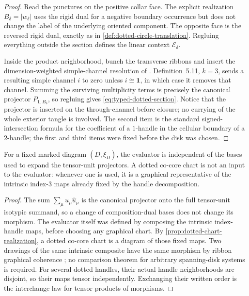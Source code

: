 \begin{proof}
Read the punctures on the positive collar face.  The explicit realization
$B_\delta=|w_\delta|$ uses the rigid dual for a negative boundary occurrence
but does not change the label of the underlying oriented component.  The
opposite face is the reversed rigid dual, exactly as in
\cref{def:dotted-circle-translation}.  Regluing everything
outside the section defines the linear context $\mathcal E_\delta$.

Inside the product neighborhood, bunch the transverse ribbons and insert the
dimension-weighted simple-channel resolution of
\cite[Lemma~2.27]{Tham2021}.  Definition~5.11, $k=3$, sends a resulting simple
channel $i$ to zero unless $i\cong\mathbf1$, in which case it removes that
channel.  Summing the surviving multiplicity terms is precisely the canonical
projector $P_{\mathbf1,B_\delta}$, so regluing gives
\eqref{eq:typed-dotted-section}.  Notice that the projector is inserted on
the through-channel before closure; no currying of the whole exterior tangle
is involved.  The second item is the standard signed-intersection formula for
the coefficient of a $1$-handle in the cellular boundary of a $2$-handle; the
first and third items were fixed before the disk was chosen.
\end{proof}

\begin{proposition}
\label{prop:graphical-auxiliary-independence}
For a fixed marked diagram $(D,\xi_D)$, the evaluator is independent of the
bases used to expand the tensor-unit projectors.  A dotted co-core chart is
not an input to the evaluator: whenever one is used, it is a graphical
representative of the intrinsic index-$3$ maps already fixed by the handle
decomposition.
\end{proposition}

\begin{proof}
The sum $\sum_\mu u_\mu\widehat u_\mu$ is the canonical projector onto the
full tensor-unit isotypic summand, so a change of composition-dual bases does
not change its morphism.  The evaluator itself was defined by composing the
intrinsic index-handle maps, before choosing any graphical chart.
By \cref{prop:dotted-chart-realization}, a dotted co-core chart is a diagram of
those fixed maps.  Two drawings of the same intrinsic composite have the same
morphism by ribbon graphical coherence \cite[Theorem~6.1]{Shum1994}; no
comparison theorem for arbitrary spanning-disk systems is required.  For
several dotted handles, their actual handle neighborhoods are disjoint, so
their maps tensor independently.  Exchanging their written order is the
interchange law for tensor products of morphisms.
\end{proof}

